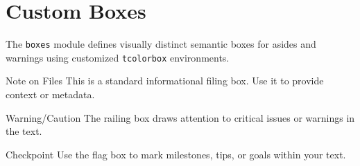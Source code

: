 \documentclass{article}
\begin{document}
\section{Custom Boxes}
The \texttt{boxes} module defines visually distinct semantic boxes for asides and warnings using customized \texttt{tcolorbox} environments.

\begin{filingbox}{Note on Files}
  This is a standard informational filing box. Use it to provide context or metadata.
\end{filingbox}

\begin{railingbox}{Warning/Caution}
  The railing box draws attention to critical issues or warnings in the text.
\end{railingbox}

\begin{flagbox}{Checkpoint}
  Use the flag box to mark milestones, tips, or goals within your text.
\end{flagbox}
\end{document}

